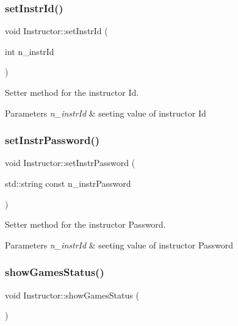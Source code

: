 \subsubsection{\texorpdfstring{set\+Instr\+Id()}{setInstrId()}}
{\footnotesize\ttfamily void Instructor\+::set\+Instr\+Id (\begin{DoxyParamCaption}\item[{int}]{n\+\_\+instr\+Id }\end{DoxyParamCaption})}



Setter method for the instructor Id. 


\begin{DoxyParams}{Parameters}
{\em n\+\_\+instr\+Id} & seeting value of instructor Id \\
\hline
\end{DoxyParams}
\mbox{\label{class_instructor_aaa6d77244009f29a2e5e1acc3d18220c}} 
\subsubsection{\texorpdfstring{set\+Instr\+Password()}{setInstrPassword()}}
{\footnotesize\ttfamily void Instructor\+::set\+Instr\+Password (\begin{DoxyParamCaption}\item[{std\+::string const}]{n\+\_\+instr\+Password }\end{DoxyParamCaption})}



Setter method for the instructor Password. 


\begin{DoxyParams}{Parameters}
{\em n\+\_\+instr\+Id} & seeting value of instructor Password \\
\hline
\end{DoxyParams}
\mbox{\label{class_instructor_a94f9564009326b43a3029fd3419e467b}} 
\subsubsection{\texorpdfstring{show\+Games\+Status()}{showGamesStatus()}}
{\footnotesize\ttfamily void Instructor\+::show\+Games\+Status (\begin{DoxyParamCaption}{ }\end{DoxyParamCaption})\hspace{0.3cm}{\ttfamily [private]}}



